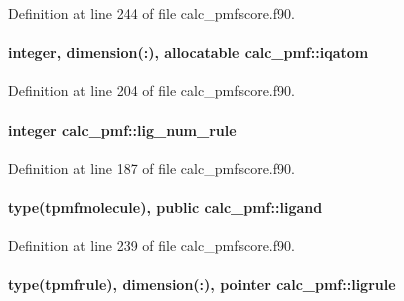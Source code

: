 Definition at line 244 of file calc\-\_\-pmfscore.\-f90.

\hypertarget{classcalc__pmf_aab09205514afe9e25c1d4750897417a6}{
\paragraph[{iqatom}]{\setlength{\rightskip}{0pt plus 5cm}integer, dimension(\-:), allocatable calc\-\_\-pmf\-::iqatom}}\label{classcalc__pmf_aab09205514afe9e25c1d4750897417a6}


Definition at line 204 of file calc\-\_\-pmfscore.\-f90.

\hypertarget{classcalc__pmf_a0159af94a3cd2d849076c0fadc4ac853}{
\paragraph[{lig\-\_\-num\-\_\-rule}]{\setlength{\rightskip}{0pt plus 5cm}integer calc\-\_\-pmf\-::lig\-\_\-num\-\_\-rule}}\label{classcalc__pmf_a0159af94a3cd2d849076c0fadc4ac853}


Definition at line 187 of file calc\-\_\-pmfscore.\-f90.

\hypertarget{classcalc__pmf_adb3a353d55dd9c86c7a56dfec5bfef05}{
\paragraph[{ligand}]{\setlength{\rightskip}{0pt plus 5cm}type({\bf tpmfmolecule}), public calc\-\_\-pmf\-::ligand}}\label{classcalc__pmf_adb3a353d55dd9c86c7a56dfec5bfef05}


Definition at line 239 of file calc\-\_\-pmfscore.\-f90.

\hypertarget{classcalc__pmf_a2e7a8f9d268914c54cd26c0fd8b01a81}{
\paragraph[{ligrule}]{\setlength{\rightskip}{0pt plus 5cm}type({\bf tpmfrule}), dimension(\-:), pointer calc\-\_\-pmf\-::ligrule}}\label{classcalc__pmf_a2e7a8f9d268914c54cd26c0fd8b01a81}


